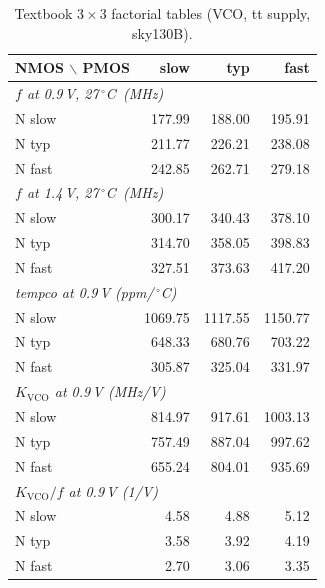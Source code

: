 \documentclass[11pt,a4paper]{article}
\newcommand{\kvco}{K_{\mathrm{VCO}}}
\newcommand{\degC}{\,$^\circ$C}
\begin{document}
\begin{table}[!htbp]\centering\small
\begin{tabular}{lrrr}\toprule
NMOS $\backslash$ PMOS & slow & typ & fast\\\midrule
\multicolumn{4}{l}{\emph{$f$ at 0.9\,V, 27\degC\ (MHz)}}\\
N slow & 177.99 & 188.00 & 195.91\\ N typ & 211.77 & 226.21 & 238.08\\ N fast & 242.85 & 262.71 & 279.18\\\midrule
\multicolumn{4}{l}{\emph{$f$ at 1.4\,V, 27\degC\ (MHz)}}\\
N slow & 300.17 & 340.43 & 378.10\\ N typ & 314.70 & 358.05 & 398.83\\ N fast & 327.51 & 373.63 & 417.20\\\midrule
\multicolumn{4}{l}{\emph{tempco at 0.9\,V (ppm/\degC)}}\\
N slow & 1069.75 & 1117.55 & 1150.77\\ N typ & 648.33 & 680.76 & 703.22\\ N fast & 305.87 & 325.04 & 331.97\\\midrule
\multicolumn{4}{l}{\emph{$\kvco$ at 0.9\,V (MHz/V)}}\\
N slow & 814.97 & 917.61 & 1003.13\\ N typ & 757.49 & 887.04 & 997.62\\ N fast & 655.24 & 804.01 & 935.69\\\midrule
\multicolumn{4}{l}{\emph{$\kvco/f$ at 0.9\,V (1/V)}}\\
N slow & 4.58 & 4.88 & 5.12\\ N typ & 3.58 & 3.92 & 4.19\\ N fast & 2.70 & 3.06 & 3.35\\\bottomrule
\end{tabular}
\caption{Textbook $3\times3$ factorial tables (VCO, tt supply, sky130B).}
\end{table}

\begin{table}[!htbp]\centering\scriptsize\setlength{\tabcolsep}{3.5pt}

\caption{All 28 closed-loop cases ($R_2=3.6$\,k$\Omega$, $C_1=68$\,pF, $C_2=6.8$\,pF, $I_{cp}=20\,\mu$A, $N=8$; 5\,$\mu$s each). All settled.}
\end{table}
\end{document}

